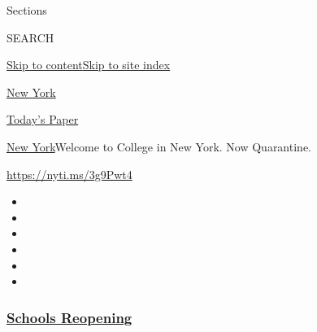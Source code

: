 Sections

SEARCH

\protect\hyperlink{site-content}{Skip to
content}\protect\hyperlink{site-index}{Skip to site index}

\href{https://www.nytimes3xbfgragh.onion/section/nyregion}{New York}

\href{https://myaccount.nytimes3xbfgragh.onion/auth/login?response_type=cookie\&client_id=vi}{}

\href{https://www.nytimes3xbfgragh.onion/section/todayspaper}{Today's
Paper}

\href{/section/nyregion}{New York}\textbar{}Welcome to College in New
York. Now Quarantine.

\url{https://nyti.ms/3g9Pwt4}

\begin{itemize}
\item
\item
\item
\item
\item
\item
\end{itemize}

\hypertarget{schools-reopening}{%
\subsubsection{\texorpdfstring{\href{https://www.nytimes3xbfgragh.onion/spotlight/schools-reopening?name=styln-coronavirus-schools-reopening\&region=TOP_BANNER\&variant=undefined\&block=storyline_menu_recirc\&action=click\&pgtype=Article\&impression_id=01f353c0-e3ae-11ea-b830-1145750edefc}{Schools
Reopening}}{Schools Reopening}}\label{schools-reopening}}

